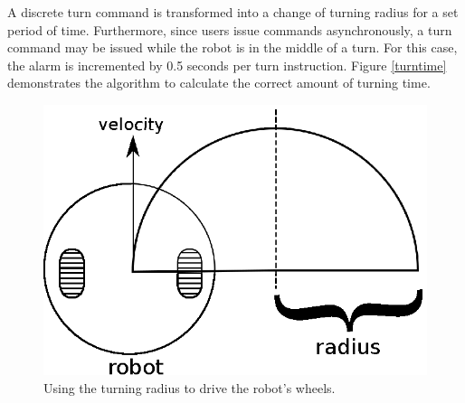 \documentclass[12pt,a4,notitlepage]{report}
\renewcommand{\_}{\texttt{\symbol{95}}}
\newcommand{\<}{\texttt{\symbol{60}}}
\renewcommand{\>}{\texttt{\symbol{62}}}
\begin{document}
A discrete turn command is transformed into a change of turning radius for a set period of time. Furthermore, since users issue commands asynchronously, a turn command may be issued while the robot is in the middle of a turn. For this case, the alarm is incremented by 0.5 seconds per turn instruction. Figure \ref{turntime} demonstrates the algorithm to calculate the correct amount of turning time.

\begin{figure}
\centering
\includegraphics[scale=0.6,angle=0]{diagrams/tradius.ps}
\caption{Using the turning radius to drive the robot's wheels.}
\label{tradius}
\end{figure}
\end{document}
